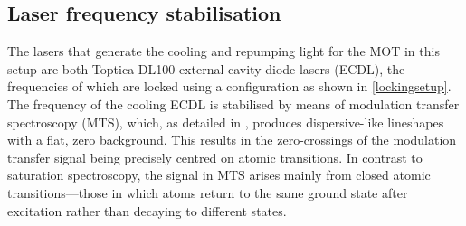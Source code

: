\documentclass[../Thesis-IJspeert.tex]{subfiles}
\begin{document}
\subsection{Laser frequency stabilisation}
The lasers that generate the cooling and repumping light for the MOT in this setup are both Toptica DL100 external cavity diode lasers (ECDL), the frequencies of which are locked using a configuration as shown in \autoref{lockingsetup}. The frequency of the cooling ECDL is stabilised by means of modulation transfer spectroscopy (MTS), which, as detailed in \cite{McCarron2008}, produces dispersive-like lineshapes with a flat, zero background. This results in the zero-crossings of the modulation transfer signal being precisely centred on atomic transitions. In contrast to saturation spectroscopy, the signal in MTS arises mainly from closed atomic transitions---those in which atoms return to the same ground state after excitation rather than decaying to different states.
\end{document}
